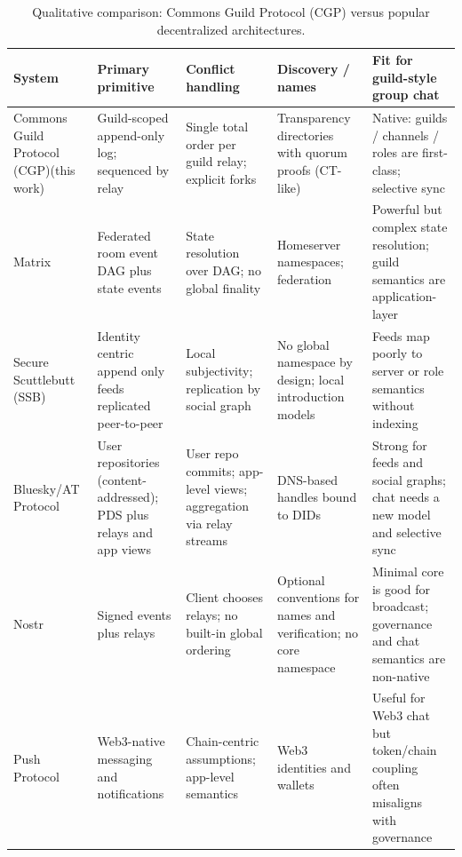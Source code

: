 \documentclass[conference]{IEEEtran}
\newcommand{\cgp}{Commons Guild Protocol (CGP)\xspace}
\newcommand{\atproto}{AT Protocol\xspace}
\newcommand{\ssb}{Secure Scuttlebutt (SSB)\xspace}
\begin{document}
\begin{table}[t]
\centering
\caption{Qualitative comparison: \cgp versus popular decentralized architectures.}
\label{tab:comparison}
\begin{tabular}{p{2.2cm} p{2.8cm} p{2.4cm} p{2.7cm} p{2.8cm}}
\toprule
\textbf{System} & \textbf{Primary primitive} & \textbf{Conflict handling} & \textbf{Discovery / names} & \textbf{Fit for guild-style group chat}\\
\midrule
\cgp (this work) & Guild-scoped append-only log; sequenced by relay & Single total order per guild relay; explicit forks & Transparency directories with quorum proofs (CT-like) \cite{rfc6962} & Native: guilds / channels / roles are first-class; selective sync\\
\midrule
Matrix \cite{jacob2020matrixdecomposition} & Federated room event DAG plus state events & State resolution over DAG; no global finality \cite{jacob2020matrixdecomposition} & Homeserver namespaces; federation \cite{jacob2020matrixdecomposition} & Powerful but complex state resolution; guild semantics are application-layer\\
\midrule
\ssb \cite{tarr2019ssb} & Identity centric append only feeds replicated peer-to-peer & Local subjectivity; replication by social graph & No global namespace by design; local introduction models & Feeds map poorly to server or role semantics without indexing\\
\midrule
Bluesky/\atproto \cite{kleppmann2024atproto}
  & User repositories (content-addressed); PDS plus relays and app views
  & User repo commits; app-level views; aggregation via relay streams \cite{kleppmann2024atproto}
  & DNS-based handles bound to DIDs \cite{kleppmann2024atproto}
  & Strong for feeds and social graphs; chat needs a new model and selective sync\\
\midrule
Nostr \cite{wei2024nostr}
  & Signed events plus relays
  & Client chooses relays; no built-in global ordering \cite{wei2024nostr}
  & Optional conventions for names and verification; no core namespace \cite{wei2024nostr}
  & Minimal core is good for broadcast; governance and chat semantics are non-native\\
\midrule
Push Protocol \cite{pushLitepaper} & Web3-native messaging and notifications & Chain-centric assumptions; app-level semantics & Web3 identities and wallets & Useful for Web3 chat but token/chain coupling often misaligns with governance\\
\bottomrule
\end{tabular}
\end{table}
\end{document}
